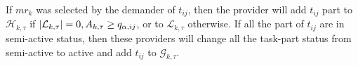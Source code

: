 If $mr_k$ was selected by the demander of $t_{ij}$, then the provider will add $t_{ij}$ part to $\mathcal{H}_{k,\tau}$ if $\left|\mathcal{L}_{k,\tau}\right|=0,A_{k,\tau}\ge q_{\alpha,ij}$, or to  $\mathcal{L}_{k,\tau}$ otherwise.
If all the part of $t_{ij}$ are in semi-active status, then these providers will change all the task-part status from semi-active to active and add $t_{ij}$ to $\mathcal{G}_{k,\tau}$.

